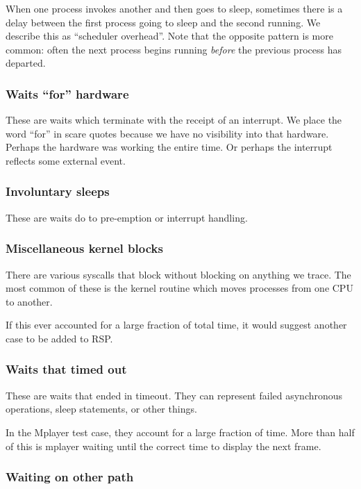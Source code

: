 \documentclass[10pt]{article}
\begin{document}
When one process invokes another and then goes to sleep, sometimes there is a delay between the first process going to sleep and the second running.  We describe this as ``scheduler overhead''.  Note that the opposite pattern is more common: often the next process begins running \emph{before} the previous process has departed.

\subsubsection{Waits ``for'' hardware}

These are waits which terminate with the receipt of an interrupt.  We place the word ``for'' in scare quotes because we have no visibility into that hardware.  Perhaps the hardware was working the entire time.  Or perhaps the interrupt reflects some external event.

\subsubsection{Involuntary sleeps}

These are waits do to pre-emption or interrupt handling.

\subsubsection{Miscellaneous kernel blocks}

There are various syscalls that block without blocking on anything we trace.  The most common of these is the kernel routine which moves processes from one CPU to another.

If this ever accounted for a large fraction of total time, it would suggest another case to be added to RSP.

\subsubsection{Waits that timed out}

These are waits that ended in timeout.  They can represent failed asynchronous operations, sleep statements, or other things.

In the Mplayer test case, they account for a large fraction of time.  More than half of this is mplayer waiting until the correct time to display the next frame.

\subsubsection{Waiting on other path}
\end{document}
